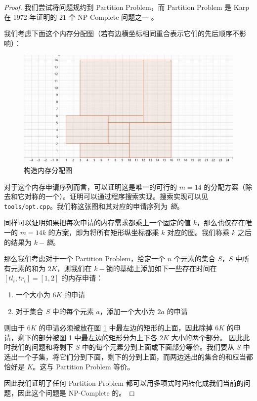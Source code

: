 \documentclass{noiassignment}
\begin{document}
	\begin{proof}
		我们尝试将问题规约到 Partition Problem，而 Partition Problem 是 Karp 在 1972 年证明的 $21$ 个 NP-Complete 问题之一 \cite{karp1972reducibility}。

		我们考虑下面这个内存分配图（若有边横坐标相同重合表示它们的先后顺序不影响）：
		\begin{figure}[htbp]
			\centering
			\includegraphics[scale=0.4]{assets/2}
			\caption{构造内存分配图}
			\label{mm_graph_lock}
		\end{figure}

		对于这个内存申请序列而言，可以证明这是唯一的可行的 $m=14$ 的分配方案（除去和它对称的一个）。证明可以通过程序搜索实现。搜索实现可以见 \texttt{tools/opt.cpp}。我们称这张图和其对应的申请序列为 \emph{锁}。
		
		同样可以证明如果把每次申请的内存需求都乘上一个固定的值 $k$，那么也仅存在唯一的 $m=14k$ 的方案，即为将所有矩形纵坐标都乘 $k$ 对应的图。我们称乘 $k$ 之后的结果为 \emph{$k-$锁}。

		那么我们考虑对于一个 Partition Problem，给定一个 $n$ 个元素的集合 $S$，$S$ 中所有元素的和为 $2K$，则我们在 $k-$锁的基础上添加如下一些存在时间在 $[tl_i, tr_i] = [1,2]$ 的内存申请：
		\begin{enumerate}
			\item 一个大小为 $6K$ 的申请
			\item 对于集合 $S$ 中的每个元素 $a$，添加一个大小为 $2a$ 的申请
		\end{enumerate}

		则由于 $6K$ 的申请必须被放在图 \ref{mm_graph_lock} 中最左边的矩形的上面，因此除掉 $6K$ 的申请，剩下的部分被图 \ref{mm_graph_lock} 中最左边的矩形分为上下各 $2K$ 大小的两个部分。
		因此此时我们的问题和将剩下 $S$ 中的每个元素分到上面或下面部分等价。我们要从 $S$ 中选出一个子集，将它们分到下面，剩下的分到上面，而两边选出的集合的和应当都恰好是 $K$。这与 Partition Problem 等价。

		因此我们证明了任何 Partition Problem 都可以用多项式时间转化成我们当前的问题，因此这个问题是 NP-Complete 的。
	\end{proof}
\end{document}
